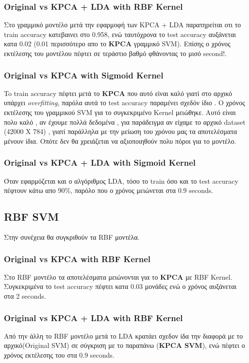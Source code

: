 \subsubsection{Original vs KPCA + LDA with RBF Kernel}
Στο γραμμικό μοντέλο μετά την εφαρμοφή των KPCA + LDA  παρατηρείται οτι το train accuracy κατεβαινει στο 0.958, ενώ ταυτόχρονα το test accuracy αυξάνεται κατα 0.02 (0.01 περισσότερο απο το \textbf{KPCA} γραμμικό SVM). Επίσης ο χρόνος εκτέλεσης του μοντέλου πέφτει σε τεράστιο βαθμό φθάνοντας το μισό second!.

\subsubsection{Original vs KPCA with Sigmoid Kernel}
To train accuracy πέφτει μετά το \textbf{KPCA} που αυτό είναι καλό γιατί στο αρχικό υπάρχει \emph{overfitting}, παρόλα αυτά το test accuracy παραμένει σχεδόν ίδιο . Ο χρόνος εκτέλεσης του
γραμμικού SVM για το συγκεκριμένο Kernel μειώθηκε. Αυτό είναι πολυ καλό , αν έχουμε πολλά δεδομένα , για παράδειγμα αν είχαμε το αρχικό dataset (42000 Χ 784) , γιατί παράλληλα με την μείωση του χρόνου μας τα αποτελέσματα μένουν ίδια. Οπότε δεν θα χρειάζεται να αξιοποιηθούν πολυ πόροι για το μοντέλο.

\subsubsection{Original vs KPCA + LDA with Sigmoid Kernel}
Όταν εφαρμόζεται και ο αλγόριθμος LDA, τόσο το train όσο και το test accuracy πέφτουν κάτω απο 90\%, παρόλο που ο χρόνος μειώνεται στα 0.9 seconds.

\subsection{RBF SVM}
Στην συνέχεια θα συγκριθούν τα RBF μοντέλα.
\subsubsection{Original vs KPCA with RBF Kernel}
Στο RBF μοντέλο τα αποτελέσματα μειώνονται για το \textbf{KPCA} με RBF Kernel. Συγκεκριμένα το test accuracy πέφτει κατα 0.03 μονάδες ενώ ο χρόνος αυξάνεται στα 2 seconds.

\subsubsection{Original vs KPCA + LDA with RBF Kernel}
Από την άλλη το RBF μοντέλο μετά το LDA  κρατάει σχεδον ίδα την διαφορά με το αρχικό(Original SVM) σε σύγκριση με το παραπάνω (\textbf{KPCA SVM}), ενώ πέφτει ο χρόνος εκτέλεσης του στα 0.9 seconds.

